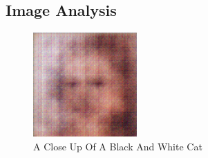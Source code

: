 \documentclass{article}%
\begin{document}
%
\subsection{Image Analysis}%
\label{subsec:ImageAnalysis}%


\begin{figure}[h!]%
\centering%
\includegraphics[width=150px]{500_fake_images/samples_5_35.png}%
\caption{A Close Up Of A Black And White Cat}%
\end{figure}

%
\end{document}
